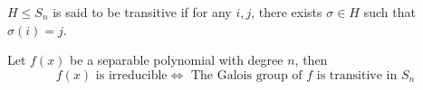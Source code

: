 \begin{definition}
  $H \leq S_n$ is said to be transitive if for any $i, j$, there exists
  $\sigma \in H$ such that $\sigma(i) = j$.
\end{definition}

\begin{fact}
  Let $f(x)$ be a separable polynomial with degree $n$, then
  \[ f(x) \text{ is irreducible} \iff
  \text{ The Galois group of } f \text{ is transitive in } S_n \]
\end{fact}
